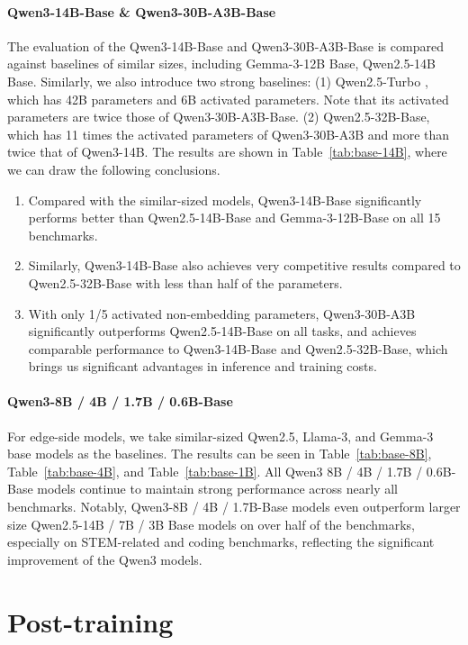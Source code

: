 \documentclass[dvipsnames]{article}
\begin{document}
\paragraph{Qwen3-14B-Base \& Qwen3-30B-A3B-Base}
The evaluation of the Qwen3-14B-Base and Qwen3-30B-A3B-Base is compared against baselines of similar sizes, including Gemma-3-12B Base, Qwen2.5-14B Base. Similarly, we also introduce two strong baselines: (1) Qwen2.5-Turbo \citep{qwen2.5}, which has 42B parameters and 6B activated parameters. Note that its activated parameters are twice those of Qwen3-30B-A3B-Base. (2) Qwen2.5-32B-Base, which has 11 times the activated parameters of Qwen3-30B-A3B and more than twice that of Qwen3-14B.
The results are shown in Table~\ref{tab:base-14B}, where we can draw the following conclusions.
\begin{enumerate}[label=(\arabic*)]
\item Compared with the similar-sized models, Qwen3-14B-Base significantly performs better than Qwen2.5-14B-Base and Gemma-3-12B-Base on all 15 benchmarks. 
\item Similarly, Qwen3-14B-Base also achieves very competitive results compared to Qwen2.5-32B-Base with less than half of the parameters.
\item With only 1/5 activated non-embedding parameters, Qwen3-30B-A3B significantly outperforms Qwen2.5-14B-Base on all tasks, and achieves comparable performance to Qwen3-14B-Base and Qwen2.5-32B-Base, which brings us significant advantages in inference and training costs.
\end{enumerate}

\paragraph{Qwen3-8B / 4B / 1.7B / 0.6B-Base}
For edge-side models, we take similar-sized Qwen2.5, Llama-3, and Gemma-3 base models as the baselines. The results can be seen in Table~\ref{tab:base-8B}, Table~\ref{tab:base-4B}, and Table~\ref{tab:base-1B}. All Qwen3 8B / 4B / 1.7B / 0.6B-Base models continue to maintain strong performance across nearly all benchmarks. Notably, Qwen3-8B / 4B / 1.7B-Base models even outperform larger size Qwen2.5-14B / 7B / 3B Base models on over half of the benchmarks, especially on STEM-related and coding benchmarks, reflecting the significant improvement of the Qwen3 models.

\section{Post-training}
\end{document}
